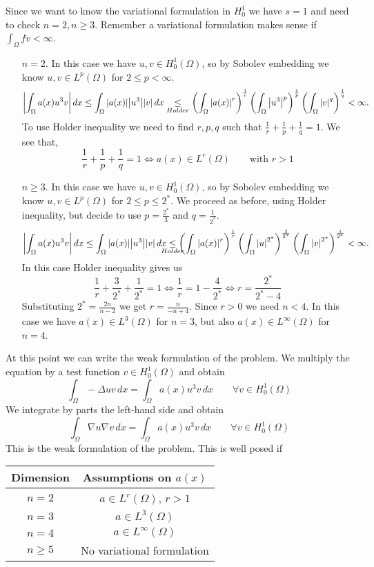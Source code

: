 Since we want to know the variational formulation in \(H^1_0\) we have \(s = 1\) and need to check \(n = 2, n \geq 3\). Remember a variational formulation makes sense if \(\int_\Omega fv < \infty\).
\begin{itemize}
    \item[\(n = 2\).] In this case we have \(u, v \in H^1_0(\Omega)\), so by Sobolev embedding we know \(u, v \in L^p(\Omega)\) for \(2 \leq p < \infty\). 
    \[
        \abs{\int_\Omega a(x) u^3 v}  \, dx \leq \int_\Omega \abs{a(x)} \abs{u^3} \abs{v} \, dx \underset{Holder}{\leq} \left(\int_\Omega \abs{a(x)}^r\right)^{\frac{1}{r}} \left(\int_\Omega \abs{u^3}^p \right)^{\frac{1}{p}} \left(\int_\Omega \abs{v}^q \right)^{\frac{1}{q}} < \infty.
    \]
    To use Holder inequality we need to find \(r, p, q\) such that \(\frac{1}{r} + \frac{1}{p} + \frac{1}{q} = 1\). We see that, 
    \[
        \frac{1}{r} + \frac{1}{p} + \frac{1}{q} = 1 \iff a(x) \in L^r(\Omega) \qquad \text{with } r > 1
    \]
    \item[\(n \geq 3\).] In this case we have \(u, v \in H^1_0(\Omega)\), so by Sobolev embedding we know \(u, v \in L^p(\Omega)\) for \(2 \leq p \leq 2^*\).
    We proceed as before, using Holder inequality, but decide to use \(p = \frac{2^*}{3}\) and \(q = \frac{1}{2^*}.\)
    \[
        \abs{\int_\Omega a(x) u^3 v}  \, dx \leq \int_\Omega \abs{a(x)} \abs{u^3} \abs{v} \, dx \underset{\mathclap{Holder}}{\leq} \left(\int_\Omega \abs{a(x)}^r\right)^{\frac{1}{r}} \left(\int_\Omega \abs{u}^{2^*} \right)^{\frac{3}{2^*}} \left(\int_\Omega \abs{v}^{2^*} \right)^{\frac{1}{2^*}} < \infty.
    \]
    In this case Holder inequality gives us 
    \[
        \frac{1}{r} + \frac{3}{2^*} + \frac{1}{2^*} = 1 \iff \frac{1}{r} = 1 - \frac{4}{2^*} \iff r = \frac{2^*}{2^* - 4}
    \]
    Substituting \(2^* = \frac{2n}{n - 2}\) we get \(r = \frac{n}{-n + 4}\). Since \(r > 0\) we need \(n < 4\).
    In this case we have \(a(x) \in L^3(\Omega)\) for \(n = 3\), but also \(a(x) \in L^\infty(\Omega)\) for \(n = 4\).
\end{itemize}

At this point we can write the weak formulation of the problem. We multiply the equation by a test function \(v \in H^1_0(\Omega)\) and obtain 
\[
    \int_\Omega - \Delta u v \, dx = \int_\Omega a(x) u^3 v \, dx \qquad \forall v \in H^1_0(\Omega)
\]
We integrate by parts the left-hand side and obtain
\[
    \int_\Omega \nabla u \nabla v \, dx = \int_\Omega a(x) u^3 v \, dx \qquad \forall v \in H^1_0(\Omega)
\]
This is the weak formulation of the problem. This is well posed if 
\begin{table}[h]
    \centering
    \begin{tabular}{|c|c|}
        \hline
        Dimension & Assumptions on $a(x)$ \\
        \hline
        $n = 2$ & $a \in L^r(\Omega)$, $r > 1$ \\
        $n = 3$ & $a \in L^3(\Omega)$ \\
        $n = 4$ & $a \in L^\infty(\Omega)$ \\
        $n \geq 5$ & No variational formulation \\
        \hline
    \end{tabular}
\end{table}
\newpage

